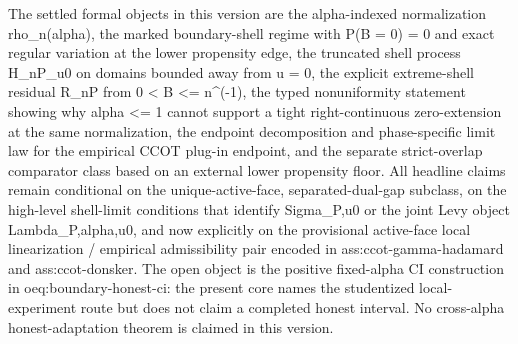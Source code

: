 \documentclass{article}
\begin{document}
The settled formal objects in this version are the alpha-indexed normalization rho_n(alpha), the marked boundary-shell regime with P(B = 0) = 0 and exact regular variation at the lower propensity edge, the truncated shell process H_nP_u0 on domains bounded away from u = 0, the explicit extreme-shell residual R_nP from 0 < B <= n^(-1), the typed nonuniformity statement showing why alpha <= 1 cannot support a tight right-continuous zero-extension at the same normalization, the endpoint decomposition and phase-specific limit law for the empirical CCOT plug-in endpoint, and the separate strict-overlap comparator class based on an external lower propensity floor. All headline claims remain conditional on the unique-active-face, separated-dual-gap subclass, on the high-level shell-limit conditions that identify Sigma_P,u0 or the joint Levy object Lambda_P,alpha,u0, and now explicitly on the provisional active-face local linearization / empirical admissibility pair encoded in ass:ccot-gamma-hadamard and ass:ccot-donsker. The open object is the positive fixed-alpha CI construction in oeq:boundary-honest-ci: the present core names the studentized local-experiment route but does not claim a completed honest interval. No cross-alpha honest-adaptation theorem is claimed in this version.
\end{document}
